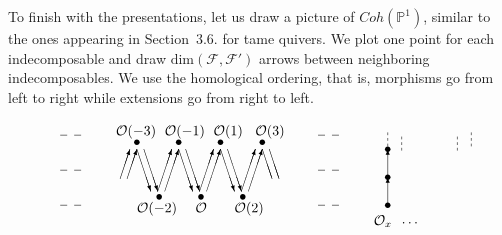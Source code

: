 \documentclass[a4paper,10pt]{amsart}
\numberwithin{equation}{section}
\begin{document}
\vspace{.1in}

To finish with the presentations, let us draw a picture of $Coh(\mathbb{P}^1)$, similar to the ones appearing in Section~3.6. for tame quivers. We plot one point for each indecomposable and draw $\text{dim}(\mathcal{F},\mathcal{F}')$ arrows between neighboring indecomposables. We use the homological ordering, that is, morphisms go from left to right while extensions go from right to left.

\vspace{.2in}

\begin{equation}\label{E:picturecohp1}
\centerline{
\begin{picture}(300,60)
\put(5,0){\line(1,0){5}}
\put(15,0){\line(1,0){5}}
\put(5,25){\line(1,0){5}}
\put(15,25){\line(1,0){5}}
\put(5,50){\line(1,0){5}}
\put(15,50){\line(1,0){5}}
\put(190,25){\line(1,0){5}}
\put(200,25){\line(1,0){5}}
\put(190,0){\line(1,0){5}}
\put(200,0){\line(1,0){5}}
\put(190,50){\line(1,0){5}}
\put(200,50){\line(1,0){5}}
\put(106,6){\circle*{4}}
\put(120,45){\circle*{4}}
\put(150,45){\circle*{4}}
\put(136,6){\circle*{4}}
\put(90,45){\circle*{4}}
\put(60,45){\circle*{4}}
\put(76,6){\circle*{4}}
\put(105,10){\vector(1,3){10}}
\put(110,10){\vector(1,3){10}}
\put(125,40){\vector(1,-3){10}}
\put(120,40){\vector(1,-3){10}}
\put(155,40){\line(1,-3){7}}
\put(150,40){\line(1,-3){7}}
\put(135,10){\vector(1,3){10}}
\put(140,10){\vector(1,3){10}}
\put(75,10){\vector(1,3){10}}
\put(80,10){\vector(1,3){10}}
\put(90,40){\vector(1,-3){10}}
\put(95,40){\vector(1,-3){10}}
\put(48,19){\vector(1,3){7}}
\put(53,19){\vector(1,3){7}}
\put(65,40){\vector(1,-3){10}}
\put(60,40){\vector(1,-3){10}}
\put(80,50){$\mathcal{O}(-1)$}
\put(60,-5){$\mathcal{O}(-2)$}
\put(45,50){$\mathcal{O}(-3)$}
\put(115,50){$\mathcal{O}(1)$}
\put(130,-5){$\small{\mathcal{O}(2)}$}
\put(145,50){$\mathcal{O}(3)$}
\put(102,-5){$\mathcal{O}$}
\put(240,42){\line(0,1){2}}
\put(240,46){\line(0,1){2}}
\put(240,50){\line(0,1){2}}
\put(300,42){\line(0,1){2}}
\put(300,46){\line(0,1){2}}
\put(300,50){\line(0,1){2}}
\put(250,39){\line(0,1){2}}
\put(250,43){\line(0,1){2}}
\put(250,47){\line(0,1){2}}
\put(290,39){\line(0,1){2}}
\put(290,43){\line(0,1){2}}
\put(290,47){\line(0,1){2}}
\put(240,0){\vector(0,1){20}}
\put(240,0){\circle*{4}}
\put(240,40){\circle*{4}}
\put(240,20){\vector(0,1){20}}
\put(240,20){\circle*{4}}
\put(230,-14){$\mathcal{O}_x$}
\put(250,-15){$\cdots$}

\end{picture}}
\end{equation}
\end{document}
